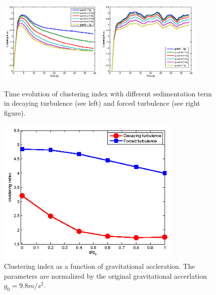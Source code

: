 \begin{figure}[h]\centering
\includegraphics[width=0.45\textwidth]{Figures/gravity_time_decay}
\includegraphics[width=0.45\textwidth]{Figures/gravity_time_force}
\caption{Time evolution of clustering index with different sedimentation term in decaying turbulence (see left) and
forced turbulence (see right figure).}
\label{fig:gravity_cluster}
\end{figure}

\begin{figure}\centering
\includegraphics[width=0.8\textwidth]{Figures/sedwithgravity}
\caption{Clustering index as a function of gravitational accleration. The parameters are normalized by the original gravitational accerlation $g_0 = 9.8m/s^2$.}\label{fig:sed_gravity}
\end{figure}

